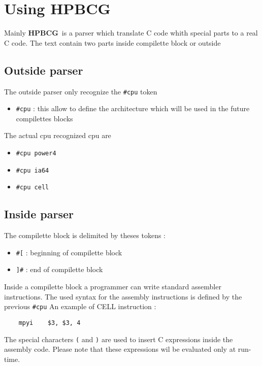 \documentclass{article}
\newcommand{\hpbcg}{\textbf{HPBCG}\ }
\begin{document}
\section{Using \hpbcg}

Mainly \hpbcg is a parser which translate C code whith special parts
to a real C code. The text contain two parts inside compilette block
or outside

\subsection{Outside parser}

The outside parser only recognize the \verb|#cpu| token

\begin{itemize}
\item \verb|#cpu| : this allow to define the architecture which will be
  used in the future compilettes blocks
\end{itemize}

The actual cpu recognized cpu are 
\begin{itemize}
\item \verb|#cpu power4|
\item \verb|#cpu ia64|
\item \verb|#cpu cell|
\end{itemize}

\subsection{Inside parser}

The compilette block is delimited by theses tokens :  

\begin{itemize}
\item \verb|#[| : beginning of compilette block
\item \verb|]#| : end of compilette block
\end{itemize}

Inside a compilette block a programmer can write standard assembler
instructions. The used syntax for the assembly instructions is defined
by the previous \verb|#cpu| An example of CELL instruction :
\begin{verbatim}
	mpyi    $3, $3, 4
\end{verbatim}

The special characters \verb|(| and \verb|)| are used to insert C
expressions inside the assembly code. Please note that these
expressions wil be evaluated only at run-time.
\end{document}
